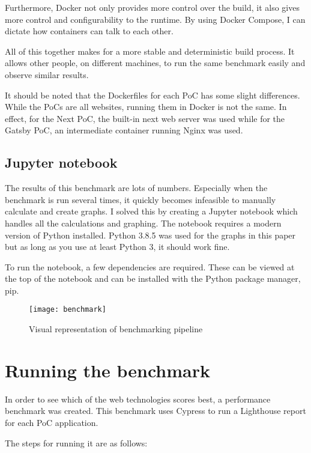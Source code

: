 Furthermore, Docker not only provides more control over the build, it also gives more control and configurability to the runtime. 
By using Docker Compose, I can dictate how containers can talk to each other.

All of this together makes for a more stable and deterministic build process. 
It allows other people, on different machines, to run the same benchmark easily and observe similar results.

It should be noted that the Dockerfiles for each PoC has some slight differences.
While the PoCs are all websites, running them in Docker is not the same. 
In effect, for the Next PoC, the built-in next web server was used while for the Gatsby PoC, an intermediate container running Nginx was used.

\subsection{Jupyter notebook}

The results of this benchmark are lots of numbers. 
Especially when the benchmark is run several times, it quickly becomes infeasible to manually calculate and create graphs.
I solved this by creating a Jupyter notebook which handles all the calculations and graphing. 
The notebook requires a modern version of Python installed. 
Python 3.8.5 was used for the graphs in this paper but as long as you use at least Python 3, it should work fine.

To run the notebook, a few dependencies are required. 
These can be viewed at the top of the notebook and can be installed with the Python package manager, pip. 


\begin{figure}[h!]
	\centering
	\texttt{[image: benchmark]}
	\caption{Visual representation of benchmarking pipeline}
	\label{fig:benchmark}
\end{figure}


\section{Running the benchmark}

In order to see which of the web technologies scores best, a performance benchmark was created. 
This benchmark uses Cypress to run a Lighthouse report for each PoC application.

The steps for running it are as follows:

